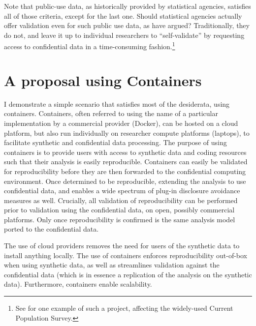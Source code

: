 \documentclass[]{hdsr}
\begin{document}
Note that public-use data, as historically provided by statistical agencies, satisfies all of those criteria, except for the last one. Should statistical agencies actually offer validation even for such public use data, as \citet{reiter_verification_2009} have argued? Traditionally, they do not, and leave it up to individual researchers to ``self-validate'' by requesting access to confidential data in a time-consuming fashion.\footnote{See \cite{armour_using_2016} for one example of such a project, affecting the widely-used Current Population Survey.}

\section{A proposal using Containers}
\label{sec:proposal}
I demonstrate a simple scenario that satisfies most of the desiderata,  using containers. Containers, often referred to using the name of a particular implementation by a commercial provider (Docker),  can be hosted on a cloud platform, but also run individually on researcher compute platforms (laptops), to facilitate synthetic and confidential data processing. The purpose of using containers is to provide users with access to synthetic data and coding resources such that their analysis is easily reproducible. Containers can easily be validated for reproducibility before they are then forwarded to the confidential computing environment. Once determined to be reproducible, extending the analysis to use confidential data, and enables a wide spectrum of plug-in disclosure avoidance measures as well. Crucially, all validation of reproducibility can be performed prior to validation using the confidential data, on open, possibly commercial platforms. Only once reproducibility is confirmed is the same analysis model ported to the confidential data. 

The use of cloud providers removes the need for users of the synthetic data to install anything locally. The use of containers enforces reproducibility out-of-box when using synthetic data, as well as streamlines validation against the confidential data (which is in essence a replication of the analysis on the synthetic data). Furthermore, containers enable scalability. 
\end{document}
